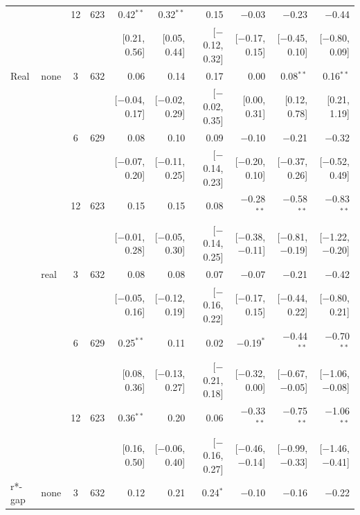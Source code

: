 \begin{longtable}{llcrrrrrrr}
 &  & 12 & 623 & 0.42$^{**}$ & 0.32$^{**}$ & 0.15 & $-$0.03 & $-$0.23 & $-$0.44\\
 & & & & {\scriptsize [0.21, 0.56]} & {\scriptsize [0.05, 0.44]} & {\scriptsize [$-$0.12, 0.32]} & {\scriptsize [$-$0.17, 0.15]} & {\scriptsize [$-$0.45, 0.10]} & {\scriptsize [$-$0.80, 0.09]}\\
\addlinespace
Real & none & 3 & 632 & 0.06 & 0.14 & 0.17 & 0.00 & 0.08$^{**}$ & 0.16$^{**}$\\
 & & & & {\scriptsize [$-$0.04, 0.17]} & {\scriptsize [$-$0.02, 0.29]} & {\scriptsize [$-$0.02, 0.35]} & {\scriptsize [0.00, 0.31]} & {\scriptsize [0.12, 0.78]} & {\scriptsize [0.21, 1.19]}\\
 &  & 6 & 629 & 0.08 & 0.10 & 0.09 & $-$0.10 & $-$0.21 & $-$0.32\\
 & & & & {\scriptsize [$-$0.07, 0.20]} & {\scriptsize [$-$0.11, 0.25]} & {\scriptsize [$-$0.14, 0.23]} & {\scriptsize [$-$0.20, 0.10]} & {\scriptsize [$-$0.37, 0.26]} & {\scriptsize [$-$0.52, 0.49]}\\
 &  & 12 & 623 & 0.15 & 0.15 & 0.08 & $-$0.28$^{**}$ & $-$0.58$^{**}$ & $-$0.83$^{**}$\\
 & & & & {\scriptsize [$-$0.01, 0.28]} & {\scriptsize [$-$0.05, 0.30]} & {\scriptsize [$-$0.14, 0.25]} & {\scriptsize [$-$0.38, $-$0.11]} & {\scriptsize [$-$0.81, $-$0.19]} & {\scriptsize [$-$1.22, $-$0.20]}\\
 & real & 3 & 632 & 0.08 & 0.08 & 0.07 & $-$0.07 & $-$0.21 & $-$0.42\\
 & & & & {\scriptsize [$-$0.05, 0.16]} & {\scriptsize [$-$0.12, 0.19]} & {\scriptsize [$-$0.16, 0.22]} & {\scriptsize [$-$0.17, 0.15]} & {\scriptsize [$-$0.44, 0.22]} & {\scriptsize [$-$0.80, 0.21]}\\
 &  & 6 & 629 & 0.25$^{**}$ & 0.11 & 0.02 & $-$0.19$^{*}$ & $-$0.44$^{**}$ & $-$0.70$^{**}$\\
 & & & & {\scriptsize [0.08, 0.36]} & {\scriptsize [$-$0.13, 0.27]} & {\scriptsize [$-$0.21, 0.18]} & {\scriptsize [$-$0.32, 0.00]} & {\scriptsize [$-$0.67, $-$0.05]} & {\scriptsize [$-$1.06, $-$0.08]}\\
 &  & 12 & 623 & 0.36$^{**}$ & 0.20 & 0.06 & $-$0.33$^{**}$ & $-$0.75$^{**}$ & $-$1.06$^{**}$\\
 & & & & {\scriptsize [0.16, 0.50]} & {\scriptsize [$-$0.06, 0.40]} & {\scriptsize [$-$0.16, 0.27]} & {\scriptsize [$-$0.46, $-$0.14]} & {\scriptsize [$-$0.99, $-$0.33]} & {\scriptsize [$-$1.46, $-$0.41]}\\
\addlinespace
r*-gap & none & 3 & 632 & 0.12 & 0.21 & 0.24$^{*}$ & $-$0.10 & $-$0.16 & $-$0.22\\

\end{longtable}
